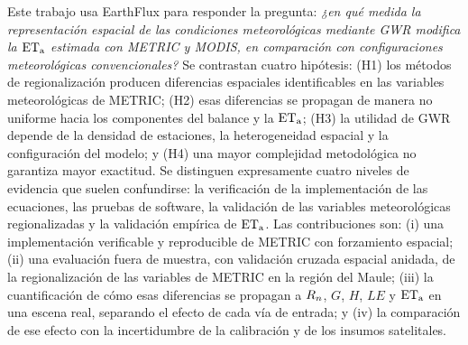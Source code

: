 Este trabajo usa EarthFlux para responder la pregunta: \emph{¿en qué medida
la representación espacial de las condiciones meteorológicas mediante GWR
modifica la $\mathrm{ET_a}$ estimada con METRIC y MODIS, en comparación con
configuraciones meteorológicas convencionales?} Se contrastan cuatro
hipótesis: (H1) los métodos de regionalización producen diferencias
espaciales identificables en las variables meteorológicas de METRIC; (H2)
esas diferencias se propagan de manera no uniforme hacia los componentes del
balance y la $\mathrm{ET_a}$; (H3) la utilidad de GWR depende de la densidad de
estaciones, la heterogeneidad espacial y la configuración del modelo; y (H4)
una mayor complejidad metodológica no garantiza mayor exactitud. Se
distinguen expresamente cuatro niveles de evidencia que suelen confundirse:
la verificación de la implementación de las ecuaciones, las pruebas de
software, la validación de las variables meteorológicas regionalizadas y la
validación empírica de $\mathrm{ET_a}$. Las contribuciones son: (i) una
implementación verificable y reproducible de METRIC con forzamiento espacial;
(ii) una evaluación fuera de muestra, con validación cruzada espacial
anidada, de la regionalización de las variables de METRIC en la región del
Maule; (iii) la cuantificación de cómo esas diferencias se propagan a
$R_n$, $G$, $H$, $LE$ y $\mathrm{ET_a}$ en una escena real, separando el efecto de
cada vía de entrada; y (iv) la comparación de ese efecto con la
incertidumbre de la calibración y de los insumos satelitales.

